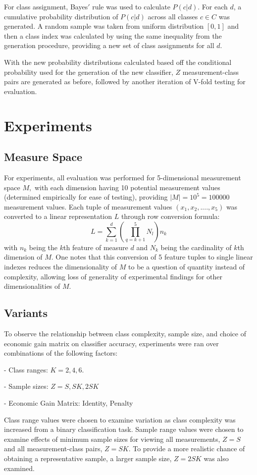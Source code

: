\documentclass[10pt, conference]{IEEEtran}
\begin{document}
For class assignment, Bayes$'$ rule was used to calculate $P(c|d)$. For each $d$, a cumulative probability distribution of $P(c|d)$ across all classes $c\in C$ was generated. A random sample was taken from uniform distribution $[0,1]$ and then a class index was calculated by using the same inequality from the generation procedure, providing a new set of class assignments for all $d$. 

With the new probability distributions calculated based off the conditional probability used for the generation of the new classifier, $Z$ measurement-class pairs are generated as before, followed by another iteration of V-fold testing for evaluation. 
\section{Experiments}
\subsection{Measure Space}
For experiments, all evaluation was performed for 5-dimensional measurement space $M,$ with each dimension having 10 potential measurement values (determined empirically for ease of testing), providing  $|M| = 10^5=100000$ measurement values. Each tuple of measurement values $(x_1,x_2,....,x_5)$ was converted to a linear representation $L$ through row conversion formula:
\begin{equation}
L = \sum_{k=1}^d (\prod_{q=k+ 1}^5 N_l ) n_k
\end{equation}
with $n_k$ being the $k$th feature of measure $d$ and $N_k$ being the cardinality of $k$th dimension of $M$. One notes that this conversion of 5 feature tuples to single linear indexes reduces the dimensionality of $M$ to be a question of quantity instead of complexity, allowing loss of generality of experimental findings for other dimensionalities of $M$.
\subsection{Variants}
To observe the relationship between class complexity, sample size, and choice of economic gain matrix on classifier accuracy, experiments were ran over combinations of the following factors:

- Class ranges: $K = 2,4,6.$

- Sample sizes: $Z= S, SK, 2SK$ 

- Economic Gain Matrix: Identity, Penalty

Class range values were chosen to examine variation as class complexity was increased from a binary classification task. Sample range values were chosen to examine effects of minimum sample sizes for viewing all measurements, $Z=S$ and all measurement-class pairs, $Z= SK$. To provide a more realistic chance of obtaining a representative sample, a larger sample size, $Z = 2SK$ was also examined. 
\end{document}

